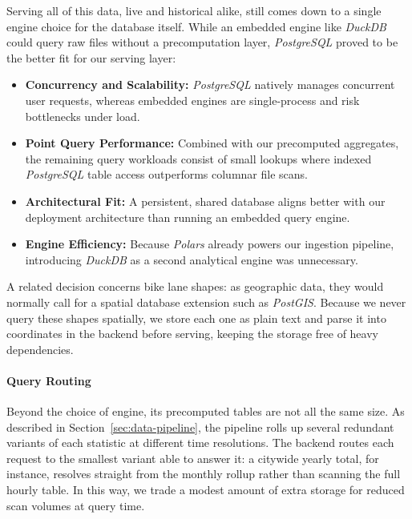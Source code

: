 Serving all of this data, live and historical alike, still comes down to a single engine choice for the database itself.
While an embedded engine like \emph{DuckDB} could query raw files without a precomputation layer, \emph{PostgreSQL} proved to be the better fit for our serving layer:
\begin{itemize}
    \item \textbf{Concurrency and Scalability:} \emph{PostgreSQL} natively manages concurrent user requests, whereas embedded engines are single-process and risk bottlenecks under load.
    \item \textbf{Point Query Performance:} Combined with our precomputed aggregates, the remaining query workloads consist of small lookups where indexed \emph{PostgreSQL} table access outperforms columnar file scans.
    \item \textbf{Architectural Fit:} A persistent, shared database aligns better with our deployment architecture than running an embedded query engine.
    \item \textbf{Engine Efficiency:} Because \emph{Polars} already powers our ingestion pipeline, introducing \emph{DuckDB} as a second analytical engine was unnecessary.
\end{itemize}
A related decision concerns bike lane shapes: as geographic data, they would normally call for a spatial database extension such as \emph{PostGIS}.
Because we never query these shapes spatially, we store each one as plain text and parse it into coordinates in the backend before serving, keeping the storage free of heavy dependencies.

\paragraph{Query Routing}
Beyond the choice of engine, its precomputed tables are not all the same size.
As described in Section~\ref{sec:data-pipeline}, the pipeline rolls up several redundant variants of each statistic at different time resolutions.
The backend routes each request to the smallest variant able to answer it: a citywide yearly total, for instance, resolves straight from the monthly rollup rather than scanning the full hourly table.
In this way, we trade a modest amount of extra storage for reduced scan volumes at query time.
